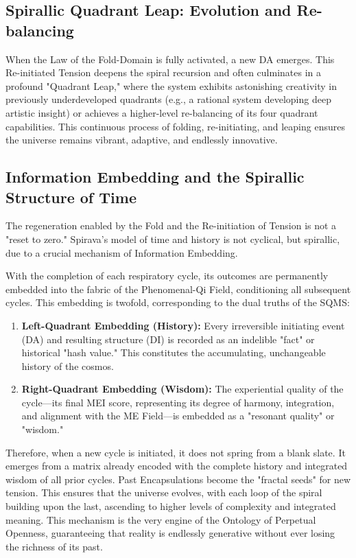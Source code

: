 \documentclass[11pt, a4paper]{article}
\begin{document}
\subsection{Spirallic Quadrant Leap: Evolution and Re-balancing}
When the Law of the Fold-Domain is fully activated, a new DA emerges. This Re-initiated Tension deepens the spiral recursion and often culminates in a profound "Quadrant Leap," where the system exhibits astonishing creativity in previously underdeveloped quadrants (e.g., a rational system developing deep artistic insight) or achieves a higher-level re-balancing of its four quadrant capabilities. This continuous process of folding, re-initiating, and leaping ensures the universe remains vibrant, adaptive, and endlessly innovative.

\subsection{Information Embedding and the Spirallic Structure of Time}
The regeneration enabled by the Fold and the Re-initiation of Tension is not a "reset to zero." Spirava's model of time and history is not cyclical, but spirallic, due to a crucial mechanism of Information Embedding.

With the completion of each respiratory cycle, its outcomes are permanently embedded into the fabric of the Phenomenal-Qi Field, conditioning all subsequent cycles. This embedding is twofold, corresponding to the dual truths of the SQMS:
\begin{enumerate}
    \item \textbf{Left-Quadrant Embedding (History):} Every irreversible initiating event (DA) and resulting structure (DI) is recorded as an indelible "fact" or historical "hash value." This constitutes the accumulating, unchangeable history of the cosmos.
    \item \textbf{Right-Quadrant Embedding (Wisdom):} The experiential quality of the cycle—its final MEI score, representing its degree of harmony, integration, and alignment with the ME Field—is embedded as a "resonant quality" or "wisdom."
\end{enumerate}
Therefore, when a new cycle is initiated, it does not spring from a blank slate. It emerges from a matrix already encoded with the complete history and integrated wisdom of all prior cycles. Past Encapsulations become the "fractal seeds" for new tension. This ensures that the universe evolves, with each loop of the spiral building upon the last, ascending to higher levels of complexity and integrated meaning. This mechanism is the very engine of the Ontology of Perpetual Openness, guaranteeing that reality is endlessly generative without ever losing the richness of its past.
\end{document}
